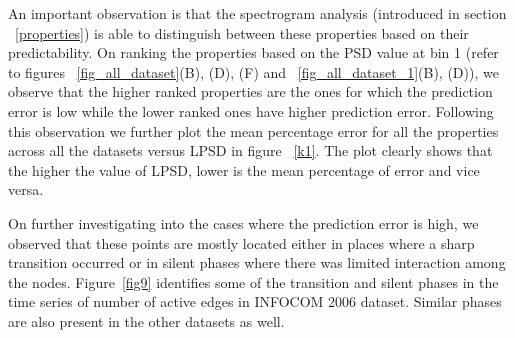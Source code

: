 An important observation is that the spectrogram analysis (introduced in section ~\ref{properties}) is able to distinguish between these properties based on their 
 predictability. On ranking the properties based on the PSD value at bin 1 (refer to figures ~\ref{fig_all_dataset}(B), (D), (F) and ~\ref{fig_all_dataset_1}(B), (D)), we observe 
 that the higher ranked properties are the ones for which the prediction error is low while the lower ranked ones have higher prediction error. 
 Following this observation we further plot the mean percentage error for all the properties across all the datasets versus LPSD in figure ~\ref{k1}. 
 The plot clearly shows that the higher the value of LPSD, lower is the 
mean percentage of error and vice versa.

On further investigating into the cases where the prediction error is high, we observed that these points are mostly located either in places where a sharp 
 transition occurred or in silent phases where there was limited interaction among the nodes. Figure~\ref{fig9} identifies some of the transition and silent phases 
 in the time series of number of active edges in INFOCOM 2006 dataset.
Similar phases are also present in the other datasets as well. 

 

